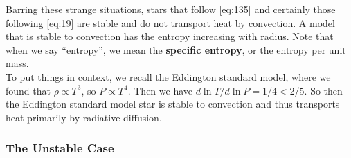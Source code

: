\documentclass[10pt]{article}
\numberwithin{equation}{section}
\newcommand{\n}{\noindent}
\begin{document}
\n Barring these strange situations, stars that follow \eqref{eq:135}
and certainly those following \eqref{eq:19} are stable and do not transport 
heat by
convection. A model that is stable to convection has the entropy
increasing with radius. Note that when we say ``entropy'', we mean the
\textbf{specific entropy}, or the entropy per unit mass.\\

\n To put things in context, we recall the Eddington standard model,
where we found that $\rho\propto T^3$, so $P\propto T^4$. Then we have
$d\ln T/d\ln P=1/4<2/5$. So then the Eddington standard model star is
stable to convection and thus transports heat primarily by radiative
diffusion.
\subsubsection{The Unstable Case}
\label{sec:unstable-case}
\end{document}
